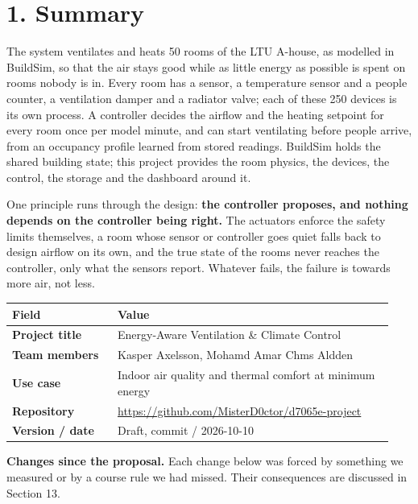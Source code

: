 \section{1. Summary}

The system ventilates and heats 50 rooms of the LTU A-house, as modelled in
BuildSim, so that the air stays good while as little energy as possible is
spent on rooms nobody is in. Every room has a \COtwo{} sensor, a temperature
sensor and a people counter, a ventilation damper and a radiator valve; each of
these 250 devices is its own process. A controller decides the airflow and the
heating setpoint for every room once per model minute, and can start
ventilating before people arrive, from an occupancy profile learned from stored
readings. BuildSim holds the shared building state; this project provides the
room physics, the devices, the control, the storage and the dashboard around
it.

One principle runs through the design: \textbf{the controller proposes, and
nothing depends on the controller being right.} The actuators enforce the
safety limits themselves, a room whose sensor or controller goes quiet falls
back to design airflow on its own, and the true state of the rooms never
reaches the controller, only what the sensors report. Whatever fails, the
failure is towards more air, not less.

\begin{longtable}[]{@{}L{0.26\linewidth}L{0.68\linewidth}@{}}
\toprule
\textbf{Field} & \textbf{Value} \\
\midrule
\endhead
\textbf{Project title} & Energy-Aware Ventilation \& Climate Control \\
\textbf{Team members} & Kasper Axelsson, Mohamd Amar Chms Aldden \\
\textbf{Use case} & Indoor air quality and thermal comfort at minimum energy \\
\textbf{Repository} & \url{https://github.com/MisterD0ctor/d7065e-project} \\
\textbf{Version / date} & Draft, commit  / 2026-10-10 \\
\bottomrule
\end{longtable}

\textbf{Changes since the proposal.} Each change below was forced by something
we measured or by a course rule we had missed. Their consequences are discussed
in Section 13.

